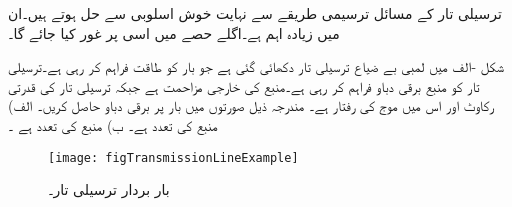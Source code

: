 ترسیلی تار کے مسائل ترسیمی طریقے سے نہایت خوش اسلوبی سے حل ہوتے ہیں۔ان میں  زیادہ اہم ہے۔اگلے حصے میں اسی پر غور کیا جائے گا۔

شکل -الف میں  لمبی بے ضیاع ترسیلی تار دکھائی گئی ہے جو  بار کو طاقت فراہم کر رہی ہے۔ترسیلی تار کو منبع  برقی دباو فراہم کر رہی ہے۔منبع کی خارجی مزاحمت  ہے جبکہ ترسیلی تار کی قدرتی رکاوٹ 
 اور اس میں موج کی رفتار  ہے۔ مندرجہ ذیل صورتوں میں بار پر برقی دباو  حاصل کریں۔ الف) منبع کی تعدد  ہے۔ ب) منبع کی تعدد  ہے ۔
\begin{figure}
\centering
\texttt{[image: figTransmissionLineExample]}
\caption{بار بردار ترسیلی تار۔}
\label{شکل_ترسیلی_تار_بار_بردار}
\end{figure}


